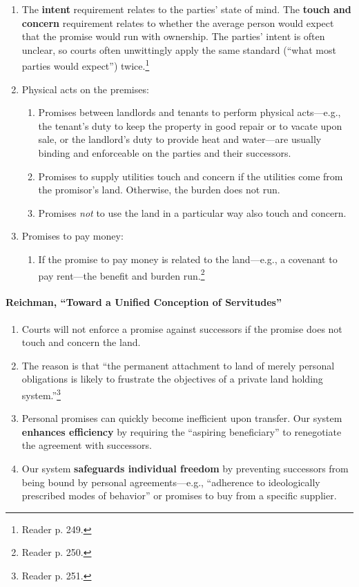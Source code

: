 \begin{enumerate}
    \item The \textbf{intent} requirement relates to the parties' state of 
    mind. The \textbf{touch and concern} requirement relates to whether the 
    average person would expect that the promise would run with ownership. 
    The parties' intent is often unclear, so courts often unwittingly apply 
    the same standard (``what most parties would expect'') 
    twice.\footnote{Reader p. 249.}
    \item Physical acts on the premises:
    \begin{enumerate}
        \item Promises between landlords and tenants to perform physical 
        acts---e.g., the tenant's duty to keep the property in good repair or 
        to vacate upon sale, or the landlord's duty to provide heat and 
        water---are usually binding and enforceable on the parties and their 
        successors.
        \item Promises to supply utilities touch and concern if the utilities 
        come from the promisor's land. Otherwise, the burden does not run.
        \item Promises \emph{not} to use the land in a particular way also 
        touch and concern.
    \end{enumerate}
    \item Promises to pay money:
    \begin{enumerate}
        \item If the promise to pay money is related to the land---e.g., a 
        covenant to pay rent---the benefit and burden run.\footnote{Reader p. 
        250.}
    \end{enumerate}
\end{enumerate}

\paragraph{Reichman, ``Toward a Unified Conception of Servitudes''}

\begin{enumerate}
    \item Courts will not enforce a promise against successors if the promise
    does not touch and concern the land.
    \item The reason is that ``the permanent attachment to land of merely 
    personal obligations is likely to frustrate the objectives of a private 
    land holding system.''\footnote{Reader p. 251.}
    \item Personal promises can quickly become inefficient upon transfer. Our 
    system \textbf{enhances efficiency} by requiring the ``aspiring 
    beneficiary'' to renegotiate the agreement with successors.
    \item Our system \textbf{safeguards individual freedom} by preventing 
    successors from being bound by personal agreements---e.g., ``adherence to 
    ideologically prescribed modes of behavior'' or promises to buy from a 
    specific supplier.
\end{enumerate}

